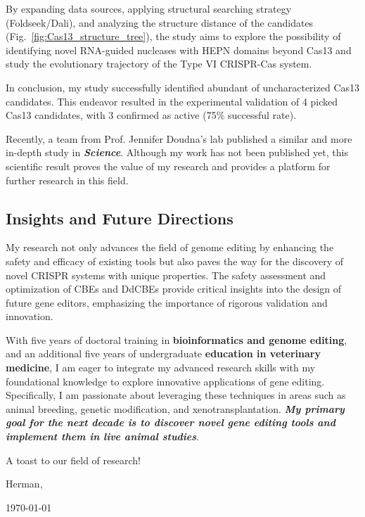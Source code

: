 \documentclass[12pt]{article}
\begin{document}
By expanding data sources, applying structural searching strategy (Foldseek/Dali), 
and analyzing the structure distance of the candidates (Fig.~\ref{fig:Cas13_structure_tree}), 
the study aims to explore the possibility of identifying novel RNA-guided nucleases with HEPN domains 
beyond Cas13 and study the evolutionary trajectory of the Type VI CRISPR-Cas system.

In conclusion, my study successfully identified abundant of uncharacterized Cas13 candidates.
This endeavor resulted in the experimental validation of 4 picked Cas13 candidates, with 3 confirmed as active (75\% successful rate). 

Recently, a team from Prof. Jennifer Doudna's lab published a similar and more in-depth study in \textbf{\textit{Science}}.
Although my work has not been published yet, this scientific result proves the value of my research
and provides a platform for further research in this field.

\subsection*{Insights and Future Directions}

My research not only advances the field of genome editing by enhancing the safety and efficacy of existing tools but also paves the way for the discovery of novel CRISPR systems with unique properties. The safety assessment and optimization of CBEs and DdCBEs provide critical insights into the design of future gene editors, emphasizing the importance of rigorous validation and innovation.

With five years of doctoral training in \textbf{bioinformatics and genome editing},
and an additional five years of undergraduate \textbf{education in veterinary medicine}, 
I am eager to integrate my advanced research skills with my foundational knowledge to explore innovative applications of gene editing. 
Specifically, I am passionate about leveraging these techniques in areas such as animal breeding, 
genetic modification, and xenotransplantation. 
\textbf{\textit{My primary goal for the next decade is to discover novel gene editing tools and implement them in live animal studies}}.

A toast to our field of research!

\hfill Herman,

\hfill \today
\end{document}
